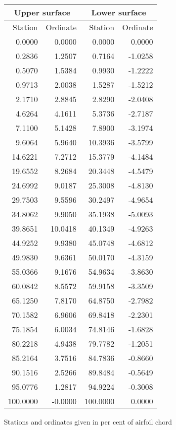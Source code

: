 \documentclass[11pt]{book}
\begin{document}
 \hspace{4mm}
 \begin{tabular}{|r|r|r|r|} \hline 
 \multicolumn{2}{|c|}{Upper surface} & \multicolumn{2}{|c|}{Lower surface} \\
 \hline
 Station & Ordinate & Station & Ordinate \\
 \hline
0.0000 & 0.0000 & 0.0000 & 0.0000 \\
0.2836 & 1.2507 & 0.7164 & -1.0258 \\
0.5070 & 1.5384 & 0.9930 & -1.2222 \\
0.9713 & 2.0038 & 1.5287 & -1.5212 \\
2.1710 & 2.8845 & 2.8290 & -2.0408 \\
4.6264 & 4.1611 & 5.3736 & -2.7187 \\
7.1100 & 5.1428 & 7.8900 & -3.1974 \\
9.6064 & 5.9640 & 10.3936 & -3.5799 \\
14.6221 & 7.2712 & 15.3779 & -4.1484 \\
19.6552 & 8.2684 & 20.3448 & -4.5479 \\
24.6992 & 9.0187 & 25.3008 & -4.8130 \\
29.7503 & 9.5596 & 30.2497 & -4.9654 \\
34.8062 & 9.9050 & 35.1938 & -5.0093 \\
39.8651 & 10.0418 & 40.1349 & -4.9263 \\
44.9252 & 9.9380 & 45.0748 & -4.6812 \\
49.9830 & 9.6361 & 50.0170 & -4.3159 \\
55.0366 & 9.1676 & 54.9634 & -3.8630 \\
60.0842 & 8.5572 & 59.9158 & -3.3509 \\
65.1250 & 7.8170 & 64.8750 & -2.7982 \\
70.1582 & 6.9606 & 69.8418 & -2.2301 \\
75.1854 & 6.0034 & 74.8146 & -1.6828 \\
80.2218 & 4.9438 & 79.7782 & -1.2051 \\
85.2164 & 3.7516 & 84.7836 & -0.8660 \\
90.1516 & 2.5266 & 89.8484 & -0.5649 \\
95.0776 & 1.2817 & 94.9224 & -0.3008 \\
100.0000 & -0.0000 & 100.0000 & 0.0000 \\
 \hline 
 \end{tabular}
 \vspace{8mm}

Stations and ordinates given in per cent of airfoil chord
\end{document}
